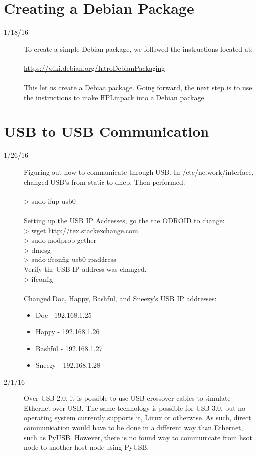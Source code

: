 \section{Creating a Debian Package}
\begin{description}
\item [1/18/16] To create a simple Debian package, we followed the instructions located at:\\ \\
\url{https://wiki.debian.org/IntroDebianPackaging}\\ \\
This let us create a Debian package. Going forward, the next step is to use the instructions to make HPLinpack into a Debian package.
\end{description}

\section{USB to USB Communication}
\begin{description}
\item [1/26/16] Figuring out how to communicate through USB. In /etc/network/interface, changed USB's from static to dhcp. Then performed: \\ \\ 
> sudo ifup usb0 \\ \\
Setting up the USB IP Addresses, go the the ODROID to change: \\
> wget http://tex.stackexchange.com \\
> sudo modprob g\textunderscore ether \\
> dmesg \\
> sudo ifconfig usb0 ipaddress \\

Verify the USB IP address was changed. \\
> ifconfig \\ \\
Changed Doc, Happy, Bashful, and Sneezy's USB IP addresses:
	\begin{itemize}
		\item Doc - 192.168.1.25
		\item Happy - 192.168.1.26
		\item Bashful - 192.168.1.27
		\item Sneezy - 192.168.1.28
	\end{itemize}
\item[2/1/16] Over USB 2.0, it is possible to use USB crossover cables to simulate Ethernet over USB. The same technology is possible for USB 3.0, but no operating system currently supports it, Linux or otherwise. As such, direct communication would have to be done in a different way than Ethernet, such as PyUSB. However, there is no found way to communicate from hsot node to another host node using PyUSB.
\end{description}

